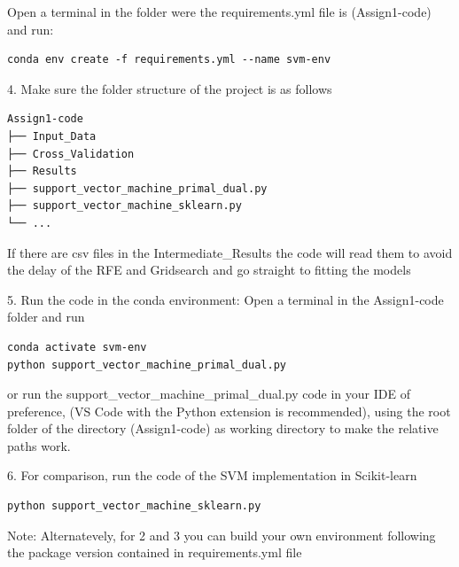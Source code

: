 \documentclass[11pt,twocolumn,letterpaper]{article}
\begin{document}
Open a terminal in the folder were the requirements.yml file is (Assign1-code) and run:

\begin{verbatim}
conda env create -f requirements.yml --name svm-env
\end{verbatim}

4. Make sure the folder structure of the project is as follows

\begin{verbatim}
Assign1-code
├── Input_Data
├── Cross_Validation
├── Results
├── support_vector_machine_primal_dual.py
├── support_vector_machine_sklearn.py
└── ...
\end{verbatim}

If there are csv files in the Intermediate\_Results the code will read them to avoid the delay of the RFE and Gridsearch and go straight to fitting the models

5.  Run the code in the conda environment: Open a terminal in the Assign1-code folder  and run 
\begin{verbatim}
conda activate svm-env
python support_vector_machine_primal_dual.py
\end{verbatim}

or run the support\_vector\_machine\_primal\_dual.py code in your IDE of preference, (VS Code with the Python extension is recommended), using the root folder of the directory (Assign1-code) as working directory to make the relative paths work.

6. For comparison, run the code of the SVM implementation in Scikit-learn
\begin{verbatim}
python support_vector_machine_sklearn.py
\end{verbatim}
Note: Alternatevely, for 2 and 3 you can build your own environment following the package version contained in requirements.yml file
\end{document}
